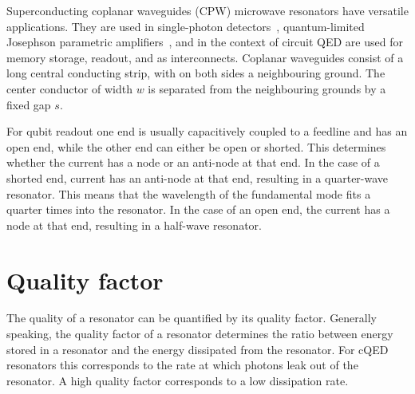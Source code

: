
    Superconducting coplanar waveguides (CPW) microwave resonators have versatile applications. They are used in single-photon detectors~\cite{tanner2010enhanced}, quantum-limited Josephson parametric amplifiers~\cite{castellanos2008amplification}, and in the context of circuit QED are used for memory storage, readout, and as interconnects. Coplanar waveguides consist of a long central conducting strip, with on both sides a neighbouring ground. The center conductor of width $w$ is separated from the neighbouring grounds by a fixed gap $s$.

    For qubit readout one end is usually capacitively coupled to a feedline and has an open end, while the other end can either be open or shorted. This determines whether the current has a node or an anti-node at that end. In the case of a shorted end, current has an anti-node at that end, resulting in a quarter-wave resonator. This means that the wavelength of the fundamental mode fits a quarter times into the resonator. In the case of an open end, the current has a node at that end, resulting in a half-wave resonator.


  \section{Quality factor}
    \label{sec:Quality factor}
    The quality of a resonator can be quantified by its quality factor. Generally speaking, the quality factor of a resonator determines the ratio between energy stored in a resonator and the energy dissipated from the resonator. For cQED resonators this corresponds to the rate at which photons leak out of the resonator. A high quality factor corresponds to a low dissipation rate.

